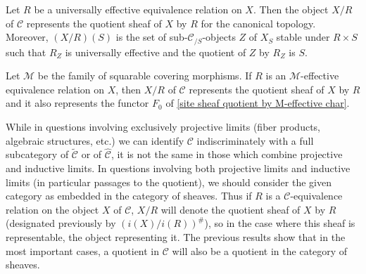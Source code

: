 \begin{corollary}\label{site sheaf quotient by universal effective represents quotient sheaf}
Let $R$ be a universally effective equivalence relation on $X$. Then the object $X/R$ of $\mathcal{C}$ represents the quotient sheaf of $X$ by $R$ for the canonical topology. Moreover, $(X/R)(S)$ is the set of sub-$\mathcal{C}_{/S}$-objects $Z$ of $X_S$ stable under $R\times S$ such that $R_Z$ is universally effective and the quotient of $Z$ by $R_Z$ is $S$.
\end{corollary}

\begin{corollary}
Let $\mathcal{M}$ be the family of squarable covering morphisms. If $R$ is an $\mathcal{M}$-effective equivalence relation on $X$, then $X/R$ of $\mathcal{C}$ represents the quotient sheaf of $X$ by $R$ and it also represents the functor $F_0$ of \cref{site sheaf quotient by M-effective char}.
\end{corollary}

While in questions involving exclusively projective limits (fiber products, algebraic structures, etc.) we can identify $\mathcal{C}$ indiscriminately with a full subcategory of $\widetilde{\mathcal{C}}$ or of $\widehat{\mathcal{C}}$, it is not the same in those which combine projective and inductive limits. In questions involving both projective limits and inductive limits (in particular passages to the quotient), we should consider the given category as embedded in the category of sheaves. Thus if $R$ is a $\mathcal{C}$-equivalence relation on the object $X$ of $\mathcal{C}$, $X/R$ will denote the quotient sheaf of $X$ by $R$ (designated previously by $(i(X)/i(R))^\#$), so in the case where this sheaf is representable, the object representing it. The previous results show that in the most important cases, a quotient in $\mathcal{C}$ will also be a quotient in the category of sheaves.\par

